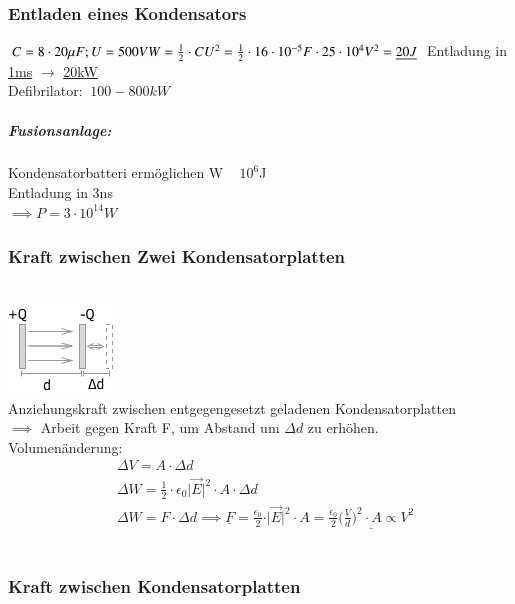 \documentclass[11pt]{article}
\begin{document}
\subsubsection{Entladen eines Kondensators}
\begin{math}
C=8\cdot 20\mu F; U=500V\\ W=\frac{1}{2}\cdot CU^2=\frac{1}{2}\cdot 16\cdot 10^{-5}F\cdot 25\cdot 10^4V^2\\ =\underline{20J}\\
\end{math}
Entladung in \underline{1ms} $\rightarrow$ \underline{20kW}\\

Defibrilator: $~ 100 - 800 kW$\\

\subparagraph{Fusionsanlage:}
Kondensatorbatteri ermöglichen W ~ $10^6$J\\
Entladung in 3ns\\
$\implies P = 3\cdot 10^{14}W$\\

\subsubsection{Kraft zwischen Zwei Kondensatorplatten}
\hfill\\
\includegraphics{skizzen/14/14_8B8}
\hfill\\
Anziehungskraft zwischen entgegengesetzt geladenen Kondensatorplatten\\
$\implies$ Arbeit gegen Kraft F, um Abstand um $\Delta d$ zu erhöhen.\\

Volumenänderung: \begin{align*}
	&\Delta V= A\cdot \Delta d\\
	&\Delta W= \frac{1}{2}\cdot \epsilon_0\vert\vec{E}\vert^2\cdot A\cdot \Delta d\\
	&\Delta W= F\cdot \Delta d \implies \underline{F}=\frac{\epsilon_0}{2}\cdot\vert\vec{E}\vert^2\cdot A=\underline{\frac{\epsilon_0}{2}\bigg(\frac{V}{d}\bigg)^2\cdot A\propto V^2}
\end{align*}\\

\subsubsection{Kraft zwischen Kondensatorplatten}
\end{document}
